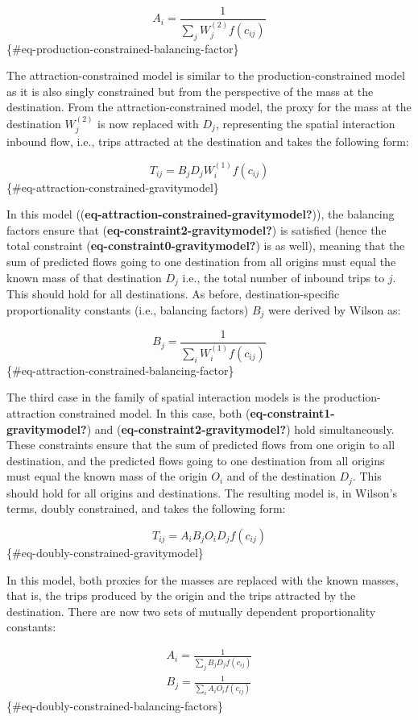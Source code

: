 \documentclass[
11pt, %
oneside, %
english, %
singlespacing, %
]{macthesis} %
\begin{document}
\[
A_i = \frac{1}{\sum_j W_j^{(2)} f(c_{ij})}
\] \{\#eq-production-constrained-balancing-factor\}

The attraction-constrained model is similar to the production-constrained model as it is also singly constrained but from the perspective of the mass at the destination. From the attraction-constrained model, the proxy for the mass at the destination \(W_j^{(2)}\) is now replaced with \(D_j\), representing the spatial interaction inbound flow, i.e., trips attracted at the destination and takes the following form:

\[
T_{ij} = B_j D_j W_i^{(1)} f(c_{ij})
\] \{\#eq-attraction-constrained-gravitymodel\}

In this model ((\textbf{eq-attraction-constrained-gravitymodel?})), the balancing factors ensure that (\textbf{eq-constraint2-gravitymodel?}) is satisfied (hence the total constraint (\textbf{eq-constraint0-gravitymodel?}) is as well), meaning that the sum of predicted flows going to one destination from all origins must equal the known mass of that destination \(D_j\) i.e., the total number of inbound trips to \(j\). This should hold for all destinations. As before, destination-specific proportionality constants (i.e., balancing factors) \(B_j\) were derived by Wilson as:

\[
B_j = \frac{1}{\sum_i W_i^{(1)} f(c_{ij})}
\] \{\#eq-attraction-constrained-balancing-factor\}

The third case in the family of spatial interaction models is the production-attraction constrained model. In this case, both (\textbf{eq-constraint1-gravitymodel?}) and (\textbf{eq-constraint2-gravitymodel?}) hold simultaneously. These constraints ensure that the sum of predicted flows from one origin to all destination, and the predicted flows going to one destination from all origins must equal the known mass of the origin \(O_i\) and of the destination \(D_j\). This should hold for all origins and destinations. The resulting model is, in Wilson's terms, doubly constrained, and takes the following form:

\[
T_{ij} = A_i B_j O_i D_j f(c_{ij})
\] \{\#eq-doubly-constrained-gravitymodel\}

In this model, both proxies for the masses are replaced with the known masses, that is, the trips produced by the origin and the trips attracted by the destination. There are now two sets of mutually dependent proportionality constants:

\[
\begin{array}{l}
A_i = \frac{1}{\sum_j B_j D_j f(c_{ij})}\\
B_j = \frac{1}{\sum_i A_i O_i f(c_{ij})}
\end{array}
\] \{\#eq-doubly-constrained-balancing-factors\}
\end{document}
